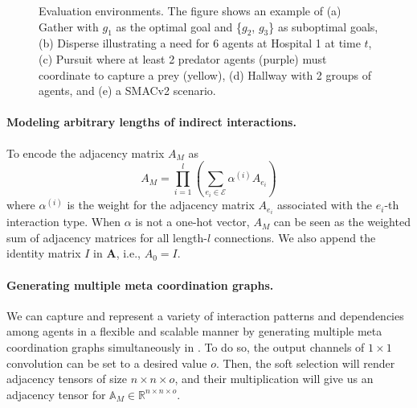 \begin{figure*}[!htp]
    \centering
    \captionsetup[subfigure]{justification=centering}
     \hfill 
     \hfill  
     \hfill 
     \hfill
    \caption{Evaluation environments. The figure shows an example of (a) Gather with $g_1$ as the optimal goal and \{$g_2$, $g_3$\} as suboptimal goals, (b) Disperse illustrating a need for 6 agents at Hospital 1 at time $t$, (c) Pursuit where at least 2 predator agents (purple) must coordinate to capture a prey (yellow), (d) Hallway with 2 groups of agents, and (e) a SMACv2 scenario.} 
    \label{fig:envs}
\end{figure*}

\paragraph{Modeling arbitrary lengths of indirect interactions.} To encode  the adjacency matrix \( A_M \)  as  \[ A_M = \prod_{i=1}^{l} \left( \sum_{e_i \in \mathcal{E}} \alpha^{(i)} A_{e_i} \right) \] where \( \alpha^{(i)} \) is the weight for the adjacency matrix \( A_{e_i} \) associated with the \( e_i \)-th interaction type. When \( \alpha \) is not a one-hot vector, \( A_M \) can be seen as the weighted sum of adjacency matrices for all length-\( l \) connections. We also append the identity matrix \( I \) in \( \bm{A} \), i.e., \( A_0 = I \). 

\paragraph{Generating multiple meta coordination graphs.} We can capture and represent a variety of interaction patterns and dependencies among agents in a flexible and scalable manner by generating multiple meta coordination graphs simultaneously in \algoabb. To do so, the output channels of \(1 \times 1\) convolution can be set to a desired value \(o\). Then, the soft selection will render adjacency tensors of size $n\times n\times o$, and their multiplication will give us an adjacency tensor for $\mathbb{A}_M \in \mathbb{R}^{n\times n\times o}$. 

